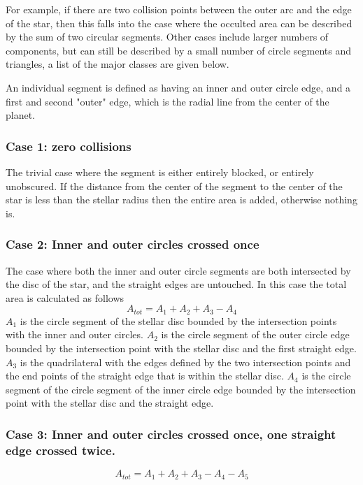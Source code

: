 \documentclass[a4paper,fleqn,usenatbib]{mnras}
\begin{document}
For example, if there are two collision points between the outer arc and the edge of the star, then this falls into the case where the occulted area can be described by the sum of two circular segments. Other cases include larger numbers of components, but can still be described by a small number of circle segments and triangles, a list of the major classes are given below.

An individual segment is defined as having an inner and outer circle edge, and a first and second "outer" edge, which is the radial line from the center of the planet.

\subsubsection{Case 1: zero collisions}
The trivial case where the segment is either entirely blocked, or entirely unobscured. If the distance from the center of the segment to the center of the star is less than the stellar radius then the entire area is added, otherwise nothing is.

\subsubsection{Case 2: Inner and outer circles crossed once}
The case where both the inner and outer circle segments are both intersected by the disc of the star, and the straight edges are untouched. In this case the total area is calculated as follows
\begin{equation} \label{eq:inner_outer}
A_{tot} = A_1 + A_2 + A_3 - A_4
\end{equation}
$A_1$ is the circle segment of the stellar disc bounded by the intersection points with the inner and outer circles. $A_2$ is the circle segment of the outer circle edge bounded by the intersection point with the stellar disc and the first straight edge. $A_3$ is the quadrilateral with the edges defined by the two intersection points and the end points of the straight edge that is within the stellar disc. $A_4$ is the circle segment of the circle segment of the inner circle edge bounded by the intersection point with the stellar disc and the straight edge. 

\subsubsection{Case 3: Inner and outer circles crossed once, one straight edge crossed twice.}

\begin{equation} \label{eq:inner_outer}
A_{tot} = A_1 + A_2 + A_3 - A_4 - A_5
\end{equation}
\end{document}
